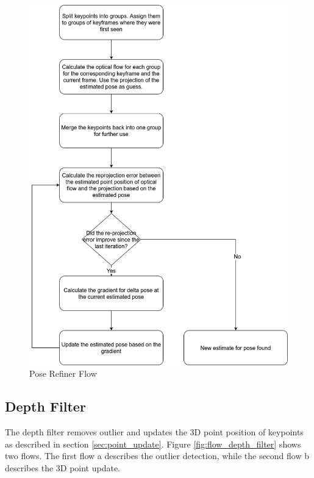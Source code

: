 \documentclass[11pt,a4paper,titlepage,oneside]{report}
\begin{document}
\begin{figure}[H]
  \centering
  \includegraphics[scale=0.3]{img/flow_pose_refiner.png}
  \caption{Pose Refiner Flow}\label{fig:flow_pose_refiner}
\end{figure}

\subsection{Depth Filter}\label{sec:depth_filter}

The depth filter removes outlier and updates the 3D point position of keypoints as described in section \ref{sec:point_update}. Figure \ref{fig:flow_depth_filter} shows two flows. The first flow a describes the outlier detection, while the second flow b describes the 3D point update.
\end{document}
